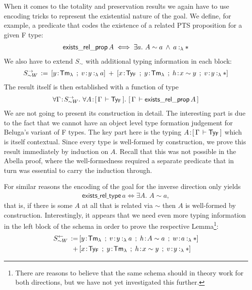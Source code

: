 \documentclass[a4paper,UKenglish]{lipics-v2016}
\newcommand{\ms}{\,}
\newcommand{\mrel}[1]{\mathrel{\ms #1 \ms}}
\newcommand{\mAnd}{\mrel{\wedge}}
\newcommand{\mAll}[1]{\ensuremath{\forall} #1.\ms\ms}
\newcommand{\mEx}[1]{\ensuremath{\exists} #1.\ms\ms}
\newcommand{\eqdef}{\mrel{:=}}
\newcommand{\TyF}{\ensuremath{\mathsf{Ty_{F}}}}
\newcommand{\TmL}{\ensuremath{\mathsf{Tm_{\lambda}}}}
\newcommand{\of}{\ensuremath{\!:\!}}
\newcommand{\typingLh}[2]{\ensuremath{#1 \mathbin{:_{\lambda}} #2}}
\newcommand{\tyr}{\mathrel{\sim}}
\newcommand{\Prp}{\ensuremath{\textrm{\textasteriskcentered}}}
\begin{document}
When it comes to the totality and preservation results we again have to use encoding tricks to represent the existential nature of the goal.
We define, for example, a predicate that codes the existence of a related PTS proposition for a given F type:
\begin{align*}
  \mathsf{exists\_rel\_prop}\,A \iff \mEx{a} A \tyr a \mAnd \typingLh{a}{\Prp}
\end{align*}
We also have to extend $S_{\tyr}$ with additional typing information in each block:
\begin{align*}
  S_{\tyr W}^{\rightarrow} \eqdef [y\of\TmL \mrel{;} v\of\typingLh{y}{a}] \mrel{+} [x\of\TyF \mrel{;} y\of\TmL \mrel{;} h\of x \tyr y \mrel{;} v\of\typingLh{y}{\Prp}]
\end{align*}
The result itself is then established with a function of type
\begin{align*}
  \mAll{\Gamma \of S_{\tyr W}^{\rightarrow}} \mAll{A \of \bc{\Gamma}{\TyF}} \bc{\Gamma}{\mathsf{exists\_rel\_prop}\,A}
\end{align*}
We are not going to present its construction in detail.
The interesting part is due to the fact that we cannot have an object level type formation judgement for Beluga's variant of F types.
The key part here is the typing $A \of \bc{\Gamma}{\TyF}$ which is itself contextual.
Since every type is well-formed by construction, we prove this result immediately by induction on $A$.
Recall that this was not possible in the Abella proof, where the well-formedness required a separate predicate that in turn was essential to carry the induction through.

For similar reasons the encoding of the goal for the inverse direction only yields
\begin{align*}
  \mathsf{exists\_rel\_type}\,a \iff \mEx{A} A \tyr a,
\end{align*}
that is, if there is some $A$ at all that is related via $\tyr$ then $A$ is well-formed by construction.
Interestingly, it appears that we need even more typing information in the left block of the schema in order to prove the respective Lemma\footnote{There are reasons to believe that the same schema should  in theory work for both directions, but we have not yet investigated this further.}:
\begin{align*}
  S_{\tyr W}^{\leftarrow} \eqdef &[y\of\TmL \mrel{;} v\of\typingLh{y}{a} \mrel{;} h\of A \tyr a \mrel{;} w \of \typingLh{a}{\Prp}]\\
  \mrel{+} &[x\of\TyF \mrel{;} y\of\TmL \mrel{;} h\of x \tyr y \mrel{;} v\of\typingLh{y}{\Prp}]
\end{align*}
\end{document}
